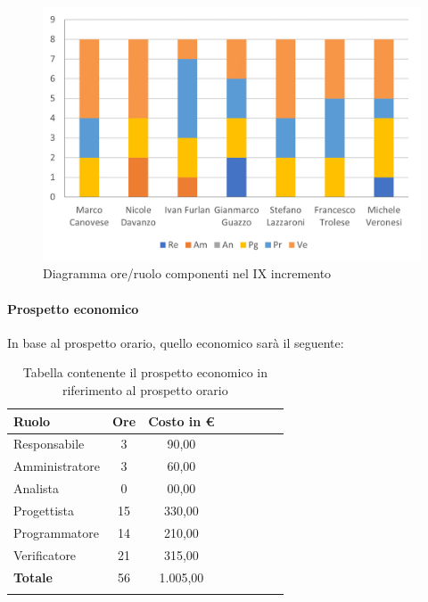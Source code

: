 \begin{figure}[H]
	\centering
	\includegraphics[width=0.8\linewidth]{res/images/preventivo/dettaglio_termineimp/2-1.png}
	\caption{Diagramma ore/ruolo componenti nel IX incremento}
	\label{fig:diagramma suddivisione ruoli IX incremento}
\end{figure}

\paragraph{Prospetto economico}
In base al prospetto orario, quello economico sarà il seguente:

\begin{longtable}{|l|c|c|c|c|c|c|c|}
	\hline
	\rowcolor{lighter-grayer}
	\textbf{Ruolo}  & \textbf{Ore} & \textbf{Costo in €} \\
	\hline
	\endfirsthead

	\hline
	Responsabile    & 3            & 90,00              \\
	\hline
	\hline
	Amministratore  & 3           & 60,00              \\
	\hline
	\hline
	Analista        & 0           & 00,00              \\
	\hline
	\hline
	Progettista     & 15            & 330,00                   \\
	\hline
	\hline
	Programmatore   & 14            & 210,00                   \\
	\hline
	\hline
	Verificatore    & 21           & 315,00              \\
	\hline
	\hline
	\textbf{Totale} & 56           & 1.005,00            \\
	\hline
	\rowcolor{white}
	\caption{Tabella contenente il prospetto economico in riferimento al prospetto orario}
\end{longtable}
\pagebreak

